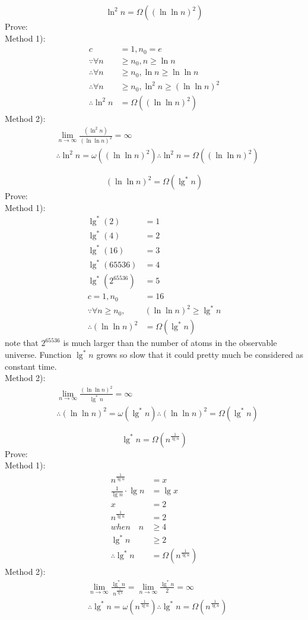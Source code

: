 \documentclass[12pt,letterpaper]{article}
\begin{document}
\begin{enumerate}
$$\ln ^2 n = \Omega((\ln \ln n)^2)$$
Prove: \\
Method 1):
\begin{align*}
c &= 1, n_0 = e \\
\because \forall n & \ge n_0, n \ge \ln n \\
\therefore \forall n & \ge n_0, \ln n \ge \ln \ln n \\
\therefore \forall n & \ge n_0, \ln ^2 n \ge (\ln \ln n)^2 \\
\therefore \ln ^2 n &= \Omega((\ln \ln n)^2)
\end{align*}
Method 2):
\begin{align*}
& \lim_{n \to \infty} \frac{(\ln ^2 n)}{(\ln \ln n)^2} = \infty \\
& \therefore \ln ^ 2 n = \omega((\ln \ln n)^2) \therefore \ln ^ 2 n = \Omega((\ln \ln n)^2)
\end{align*}

$$(\ln \ln n)^2 = \Omega(\lg ^* n)$$
Prove: \\
Method 1):
\begin{align*}
\lg^*(2) &= 1 \\
\lg^*(4) &= 2 \\
\lg^*(16) &= 3 \\
\lg^*(65536) &= 4 \\
\lg^*(2^{65536}) &= 5 \\
c = 1, n_0 & = 16 \\
\because \forall n \ge n_0, &(\ln \ln n)^2 \ge \lg ^* n \\
\therefore (\ln \ln n)^2 &= \Omega(\lg ^* n)
\end{align*}
note that $2^{65536}$ is much larger than the number of atoms in the observable universe. Function $\lg ^* n$ grows so slow that it could pretty much be considered as constant time. \\
Method 2):
\begin{align*}
& \lim_{n \to \infty} \frac{(\ln \ln n)^2}{\lg ^* n} = \infty \\
& \therefore (\ln \ln n)^2 = \omega (\lg ^* n) \therefore (\ln \ln n)^2 = \Omega(\lg ^* n)
\end{align*}

$$\lg ^* n =\Omega(n^{\frac{1}{\lg n}})$$
Prove: \\
Method 1):
\begin{align*}
n^{\frac{1}{\lg n}} &= x \\
\frac{1}{\lg n} \cdot \lg n &= \lg x \\
x &= 2 \\
n^{\frac{1}{\lg n}} & = 2 \\
when \quad n &\ge 4 \\
\lg ^* n &\ge 2 \\
\therefore \lg ^* n &=\Omega(n^{\frac{1}{\lg n}})
\end{align*}
Method 2):
\begin{align*}
& \lim_{n \to \infty} \frac{\lg ^* n}{n ^{\frac{1}{\lg n}}} = \lim_{n \to \infty} \frac{\lg ^* n}{2} = \infty \\
& \therefore \lg ^* n = \omega(n^{\frac{1}{\lg n}}) \therefore \lg ^* n = \Omega(n^{\frac{1}{\lg n}})
\end{align*}


\end{enumerate}
\end{document}
